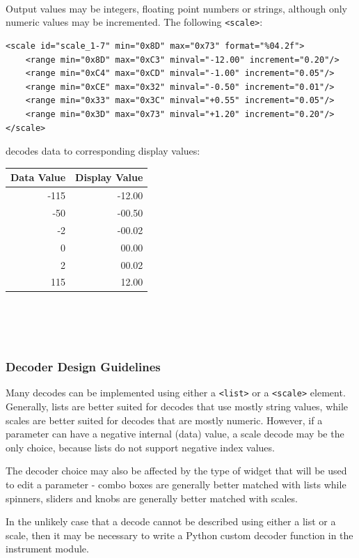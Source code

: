 \documentclass[a4paper,twoside,12pt]{article}
\newcommand{\code}[1]{\color{red}\texttt{#1}\color{black}}
\begin{document}
\\
\\
\\
Output values may be integers, floating point numbers or strings,
although only numeric values may be incremented. The following
\code{<scale>}:
\begin{verbatim}
<scale id="scale_1-7" min="0x8D" max="0x73" format="%04.2f">
    <range min="0x8D" max="0xC3" minval="-12.00" increment="0.20"/>
    <range min="0xC4" max="0xCD" minval="-1.00" increment="0.05"/>
    <range min="0xCE" max="0x32" minval="-0.50" increment="0.01"/>
    <range min="0x33" max="0x3C" minval="+0.55" increment="0.05"/>
    <range min="0x3D" max="0x73" minval="+1.20" increment="0.20"/>
</scale>
\end{verbatim}
decodes data to corresponding display values:
\begin{tabular}{|r|r|} \hline
Data Value & Display Value \\
\hline
-115 & -12.00 \\
-50 & -00.50 \\
-2 & -00.02 \\
0 & 00.00 \\
2 & 00.02 \\
115 & 12.00 \\
\hline
\end{tabular}
\\
\\
\\

\subsubsection{Decoder Design Guidelines}
Many decodes can be implemented using either a \code{<list>}{} or
a \code{<scale>}{} element. Generally, lists are better suited for
decodes that use mostly string values, while scales are better
suited for decodes that are mostly numeric. However, if a
parameter can have a negative internal (data) value, a scale
decode may be the only choice, because lists do not support
negative index values.

The decoder choice may also be affected by the type of widget that
will be used to edit a parameter - combo boxes are generally
better matched with lists while spinners, sliders and knobs are
generally better matched with scales.

In the unlikely case that a decode cannot be described using
either a list or a scale, then it may be necessary to write a
Python custom decoder function in the instrument module.
\end{document}
